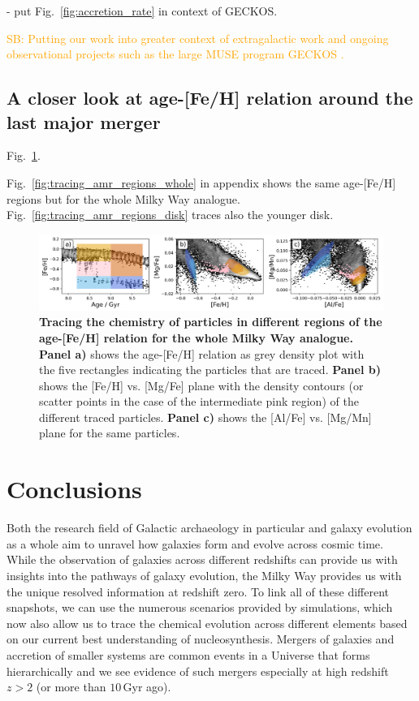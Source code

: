 \documentclass[fleqn,usenatbib]{mnras}
\newcommand{\SB}[1]{{\textcolor{orange}{SB: #1}}}
\begin{document}
- put Fig.~\ref{fig:accretion_rate} in context of GECKOS.

\SB{Putting our work into greater context of extragalactic work \citep[e.g.][]{Pinna2019, Pinna2019b, Martig2021} and ongoing observational projects such as the large MUSE program GECKOS \citep{GECKOS2023}.}

\subsection{A closer look at age-[Fe/H] relation around the last major merger}

Fig.~\ref{fig:tracing_amr_regions_footprint}.

Fig.~\ref{fig:tracing_amr_regions_whole} in appendix shows the same age-[Fe/H] regions but for the whole Milky Way analogue. Fig.~\ref{fig:tracing_amr_regions_disk} traces also the younger disk.

\begin{figure}
	\includegraphics[width=\textwidth]{figures/tracing_amr_regions_footprint.png}
\caption{
    \textbf{Tracing the chemistry of particles in different regions of the age-[Fe/H] relation for the whole Milky Way analogue.}
    \textbf{Panel a)} shows the age-[Fe/H] relation as grey density plot with the five rectangles indicating the particles that are traced.
    \textbf{Panel b)} shows the [Fe/H] vs. [Mg/Fe] plane with the density contours (or scatter points in the case of the intermediate pink region) of the different traced particles.
    \textbf{Panel c)} shows the [Al/Fe] vs. [Mg/Mn] plane for the same particles.
    }    \label{fig:tracing_amr_regions_footprint}
\end{figure}

\section{Conclusions}
\label{sec:conc}

Both the research field of Galactic archaeology in particular and galaxy evolution as a whole aim to unravel how galaxies form and evolve across cosmic time. While the observation of galaxies across different redshifts can provide us with insights into the pathways of galaxy evolution, the Milky Way provides us with the unique resolved information at redshift zero. To link all of these different snapshots, we can use the numerous scenarios provided by simulations, which now also allow us to trace the chemical evolution across different elements based on our current best understanding of nucleosynthesis. Mergers of galaxies and accretion of smaller systems are common events in a Universe that forms hierarchically and we see evidence of such mergers especially at high redshift $z > 2$ (or more than $10\,\mathrm{Gyr}$ ago).
\end{document}
